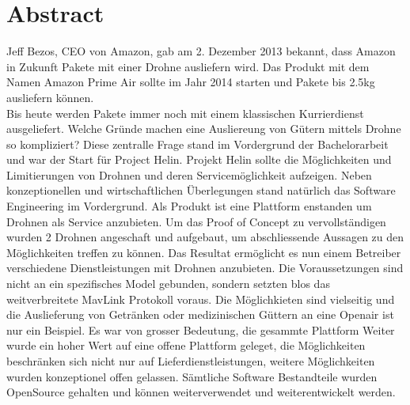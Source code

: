 \newpage
{}
\chapter*{Abstract}
Jeff Bezos, CEO von Amazon, gab am 2. Dezember 2013 bekannt, dass Amazon in Zukunft Pakete mit einer Drohne ausliefern wird. Das Produkt mit dem Namen Amazon Prime Air sollte im Jahr 2014 starten und Pakete bis 2.5kg ausliefern können. \\
Bis heute werden Pakete immer noch mit einem klassischen Kurrierdienst ausgeliefert. Welche Gründe machen eine Ausliereung von Gütern mittels Drohne so kompliziert? Diese zentralle Frage stand im Vordergrund der Bachelorarbeit und war der Start für Project Helin. 
Projekt Helin sollte die Möglichkeiten und Limitierungen von Drohnen und deren Servicemöglichkeit aufzeigen.
Neben konzeptionellen und wirtschaftlichen Überlegungen stand natürlich das Software Engineering im Vordergrund. Als Produkt ist eine Plattform enstanden um Drohnen als Service anzubieten. Um das Proof of Concept zu vervollständigen wurden 2 Drohnen angeschaft und aufgebaut, um abschliessende Aussagen zu den Möglichkeiten treffen zu können. Das Resultat ermöglicht es nun einem Betreiber verschiedene Dienstleistungen mit Drohnen anzubieten. Die Voraussetzungen sind nicht an ein spezifisches Model gebunden, sondern setzten blos das weitverbreitete MavLink Protokoll voraus. Die Möglichkieten sind vielseitig und die Auslieferung von Getränken oder medizinischen Güttern an eine Openair ist nur ein Beispiel. Es war von grosser Bedeutung, die gesammte Plattform  Weiter wurde ein hoher Wert auf eine offene Plattform geleget, die Möglichkeiten beschränken sich nicht nur auf Lieferdienstleistungen, weitere Möglichkeiten wurden konzeptionel offen gelassen. Sämtliche Software Bestandteile wurden OpenSource gehalten und können weiterverwendet und weiterentwickelt werden.